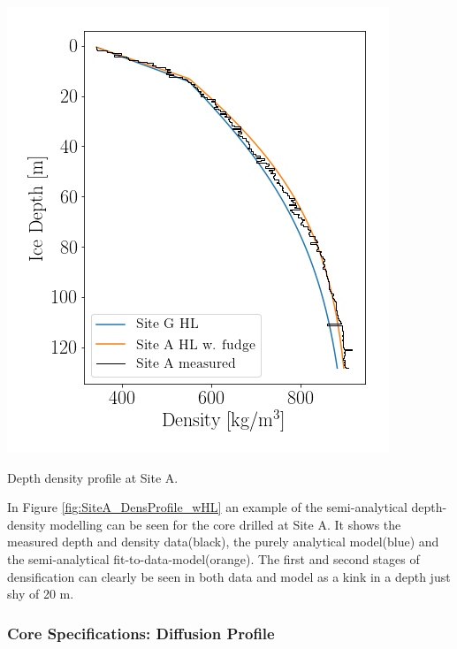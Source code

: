 \documentclass[../../CompleteThesis/Complete_1stDraft.tex]{subfiles}
\begin{document}
\begin{marginfigure}
	\centering
	\includegraphics[width=\marginparwidth]{SiteA_DensProfile_wHL.jpg}
	\caption[Herron Langway density profile Site A]{\footnotesize{Depth density profile at Site A.}}%
	\label{fig:SiteA_DensProfile_wHL}
\end{marginfigure}
In Figure \ref{fig:SiteA_DensProfile_wHL} an example of the semi-analytical depth-density modelling can be seen for the core drilled at Site A. It shows the measured depth and density data(black), the purely analytical model(blue) and the semi-analytical fit-to-data-model(orange). The first and second stages of densification can clearly be seen in both data and model as a kink in a depth just shy of 20 m.

\subsubsection[Diffusion Profile]{Core Specifications: Diffusion Profile}
\label{Subsubsec:Method_FirstSigmaEstimate_PrelimComputations_DiffProfile}
\end{document}

